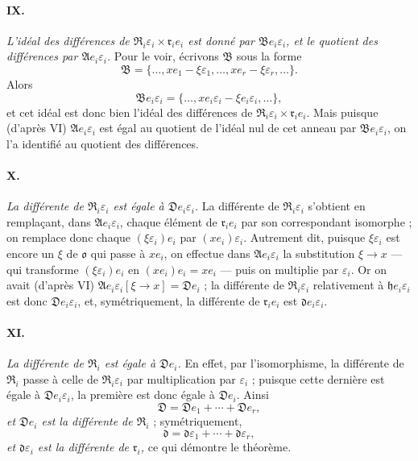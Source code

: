 \paragraph{IX.}
\emph{L'idéal des différences de $\mathfrak R_i\varepsilon_i\times\mathfrak r_i e_i$ est donné par $\mathfrak B e_i\varepsilon_i$, et le quotient des différences par $\mathfrak A e_i\varepsilon_i$.} Pour le voir, écrivons $\mathfrak B$ sous la forme
\[
\mathfrak B=\{\ldots,xe_1-\xi\varepsilon_1,\ldots,xe_r-\xi\varepsilon_r,\ldots\}.
\]
Alors
\[
\mathfrak B e_i\varepsilon_i
=\{\ldots,xe_i\varepsilon_i-\xi e_i\varepsilon_i,\ldots\},
\]
et cet idéal est donc bien l'idéal des différences de $\mathfrak R_i\varepsilon_i\times\mathfrak r_i e_i$. Mais puisque (d'après VI) $\mathfrak A e_i\varepsilon_i$ est égal au quotient de l'idéal nul de cet anneau par $\mathfrak B e_i\varepsilon_i$, on l'a identifié au quotient des différences.

\paragraph{X.}
\emph{La différente de $\mathfrak R_i\varepsilon_i$ est égale à $\mathfrak D e_i\varepsilon_i$.} La différente de $\mathfrak R_i\varepsilon_i$ s'obtient en remplaçant, dans $\mathfrak A e_i\varepsilon_i$, chaque élément de $\mathfrak r_i e_i$ par son correspondant isomorphe ; on remplace donc chaque $(\xi\varepsilon_i)e_i$ par $(xe_i)\varepsilon_i$. Autrement dit, puisque $\xi\varepsilon_i$ est encore un $\xi$ de $\mathfrak o$ qui passe à $xe_i$, on effectue dans $\mathfrak A e_i\varepsilon_i$ la substitution $\xi\to x$ --- qui transforme $(\xi\varepsilon_i)e_i$ en $(xe_i)e_i=xe_i$ --- puis on multiplie par $\varepsilon_i$. Or on avait (d'après VI) $\mathfrak A e_i\varepsilon_i[\xi\to x]=\mathfrak D e_i$ ; la différente de $\mathfrak R_i\varepsilon_i$ relativement à $\mathfrak h e_i\varepsilon_i$ est donc $\mathfrak D e_i\varepsilon_i$, et, symétriquement, la différente de $\mathfrak r_i e_i$ est $\mathfrak d e_i\varepsilon_i$.

\paragraph{XI.}
\emph{La différente de $\mathfrak R_i$ est égale à $\mathfrak D e_i$.} En effet, par l'isomorphisme, la différente de $\mathfrak R_i$ passe à celle de $\mathfrak R_i\varepsilon_i$ par multiplication par $\varepsilon_i$ ; puisque cette dernière est égale à $\mathfrak D e_i\varepsilon_i$, la première est donc égale à $\mathfrak D e_i$. Ainsi
\[
\mathfrak D=\mathfrak D e_1+\cdots+\mathfrak D e_r,
\]
\emph{et $\mathfrak D e_i$ est la différente de $\mathfrak R_i$} ; symétriquement,
\[
\mathfrak d=\mathfrak d\varepsilon_1+\cdots+\mathfrak d\varepsilon_r,
\]
\emph{et $\mathfrak d\varepsilon_i$ est la différente de $\mathfrak r_i$,} ce qui démontre le théorème.

